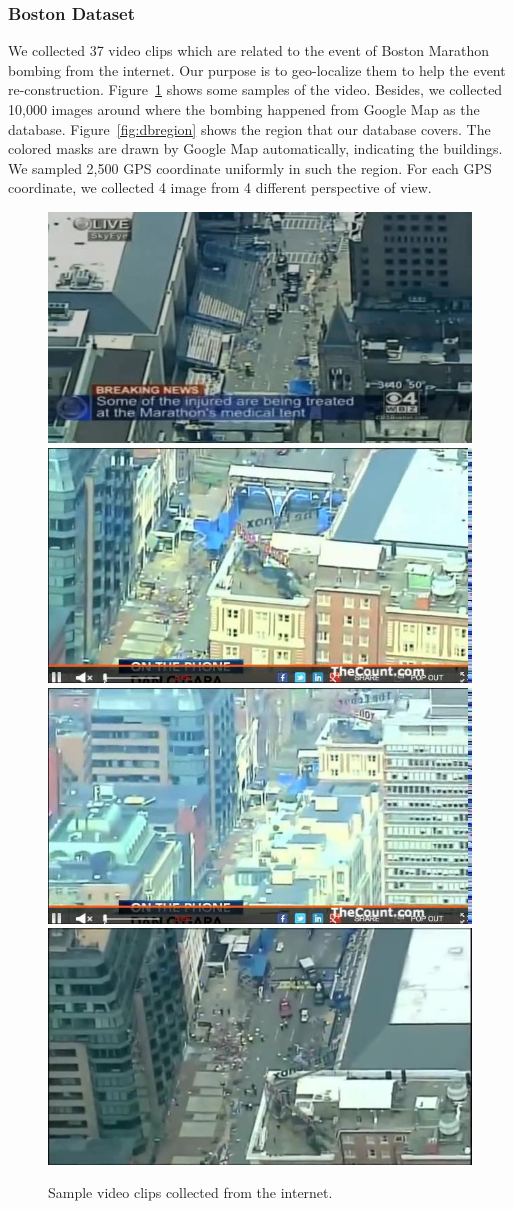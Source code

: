 \subsubsection{Boston Dataset}
\par 
We collected 37 video clips which are related to the event of Boston Marathon bombing from the internet. Our purpose is to geo-localize them to help the event re-construction. Figure~\ref{fig:bostonvideo} shows some samples of the video. Besides, we collected 10,000 images around where the bombing happened from Google Map as the database. Figure~\ref{fig:dbregion} shows the region that our database covers. The colored masks are drawn by Google Map automatically, indicating the buildings. We sampled 2,500 GPS coordinate uniformly in such the region. For each GPS coordinate, we collected 4 image from 4 different perspective of view. 
\begin{figure}[htbp]
\includegraphics[width=0.45\linewidth]{img/video_1}
\includegraphics[width=0.45\linewidth]{img/video_2}
\\[0.1cm]
\includegraphics[width=0.45\linewidth]{img/video_3}
\includegraphics[width=0.45\linewidth]{img/video_4}
\caption{Sample video clips collected from the internet.}
\label{fig:bostonvideo}
\end{figure}
